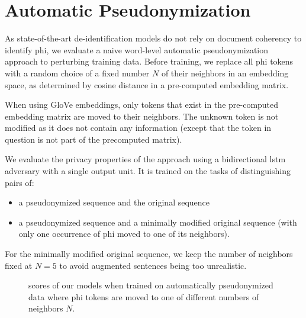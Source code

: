 
\section{Automatic Pseudonymization}\label{sec:automatic-pseudonymization}
%
As state-of-the-art de-identification models do not rely on document coherency to identify \ac{phi}, we evaluate a naive word-level automatic pseudonymization approach to perturbing training data.
%
Before training, we replace all \ac{phi} tokens with a random choice of a fixed number $N$ of their neighbors in an embedding space, as determined by cosine distance in a pre-computed embedding matrix.

%
When using GloVe embeddings, only tokens that exist in the pre-computed embedding matrix are moved to their neighbors.
%
The unknown token is not modified as it does not contain any information (except that the token in question is not part of the precomputed matrix).

%
We evaluate the privacy properties of the approach using a bidirectional \ac{lstm} adversary with a single output unit.
%
It is trained on the tasks of distinguishing pairs of:
\begin{itemize}
    \item a pseudonymized sequence and the original sequence
    \item a pseudonymized sequence and a minimally modified original sequence (with only one occurrence of \ac{phi} moved to one of its neighbors).
\end{itemize}
%
For the minimally modified original sequence, we keep the number of neighbors fixed at $N=5$ to avoid augmented sentences being too unrealistic.

\begin{figure}
    \centering
    
    \caption[De-identification with automatic pseudonymization]{\fone scores of our models when trained on automatically pseudonymized data where \ac{phi} tokens are moved to one of different numbers of neighbors $N$.}\label{fig:auto-pseudo}
\end{figure}